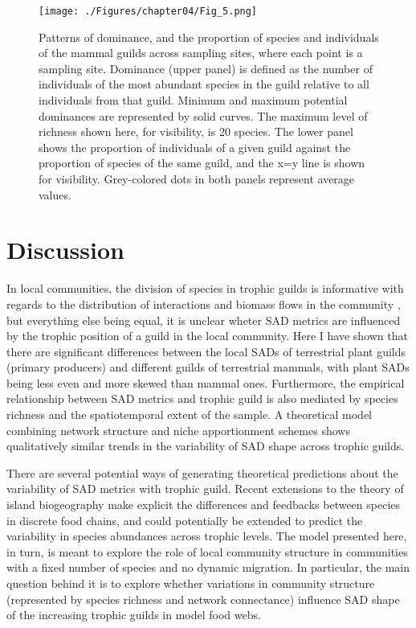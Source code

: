 \begin{figure}[ht]
\texttt{[image: ./Figures/chapter04/Fig\_5.png]}
\caption[Species/indiv. proportion and dominance in guilds]{\color{Gray} Patterns of dominance, and the proportion of species and individuals of the mammal guilds across sampling sites, where each point is a sampling site. Dominance (upper panel) is defined as the number of individuals of the most abundant species in the guild relative to all individuals from that guild. Minimum and maximum potential dominances are represented by solid curves. The maximum level of richness shown here, for visibility, is 20 species. The lower panel shows the proportion of individuals of a given guild against the proportion of species of the same guild, and the x=y line is shown for visibility. Grey-colored dots in both panels represent average values.}\label{fig:fig4.5}
\end{figure}

\section{Discussion}

In local communities, the division of species in trophic guilds is informative with regards to the distribution of interactions and biomass flows in the community \citep{Lindeman1942, Kefi2016a}, but everything else being equal, it is unclear wheter SAD metrics are influenced by the trophic position of a guild in the local community. Here I have shown that there are significant differences between the local SADs of terrestrial plant guilds (primary producers) and different guilds of terrestrial mammals, with plant SADs being less even and more skewed than mammal ones. Furthermore, the empirical relationship between SAD metrics and trophic guild is also mediated by species richness and the spatiotemporal extent of the sample. A theoretical model combining network structure and niche apportionment schemes shows qualitatively similar trends in the variability of SAD shape across trophic guilds.

There are several potential ways of generating theoretical predictions about the variability of SAD metrics with trophic guild. Recent extensions to the theory of island biogeography \citep{Holt2009a, Gravel2011} make explicit the differences and feedbacks between species in discrete food chains, and could potentially be extended to predict the variability in species abundances across trophic levels. The model presented here, in turn, is meant to explore the role of local community structure in communities with a fixed number of species and no dynamic migration. In particular, the main question behind it is to explore whether variations in community structure (represented by species richness and network connectance) influence SAD shape of the increasing trophic guilds in model food webs.

